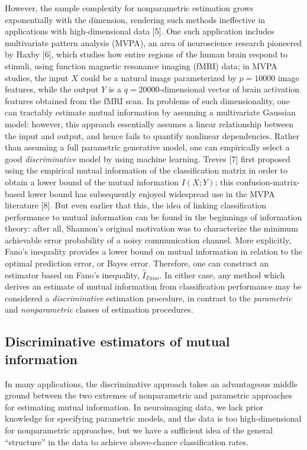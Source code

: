 \documentclass{article}
\begin{document}
However, the sample complexity for nonparametric estimation grows
exponentially with the dimension, rendering such methods ineffective
in applications with high-dimensional data [5].  One such
application includes multivariate pattern analysis (MVPA), an area of
neuroscience research pioneered by Haxby [6], which studies how
entire regions of the human brain respond to stimuli, using function
magnetic resonance imaging (fMRI) data; in MVPA studies, the input $X$
could be a natural image parameterized by $p = 10000$ image features,
while the output $Y$ is a $q=20000$-dimensional vector of brain
activation features obtained from the fMRI scan.  In problems of such
dimensionality, one can tractably estimate mutual information by
assuming a multivariate Gaussian model: however, this approach
essentially assumes a linear relationship between the input and
output, and hence fails to quantify nonlinear dependencies.  Rather
than assuming a full parametric generative model, one can empirically
select a good \emph{discriminative} model by using machine learning.
Treves [7] first proposed using the empirical mutual information of
the classification matrix in order to obtain a lower bound of the
mutual information $I(X; Y)$; this confusion-matrix-based lower bound
has subsequently enjoyed widespread use in the MVPA literature
[8].  But even earlier that this, the idea of linking
classification performance to mutual information can be found in the
beginnings of information theory: after all, Shannon's original
motivation was to characterize the minimum achievable error
probability of a noisy communication channel.  More explicitly, Fano's
inequality provides a lower bound on mutual information in relation to
the optimal prediction error, or Bayes error.  Therefore, one can
construct an estimator based on Fano's inequality, $\hat{I}_{Fano}$.
In either case, any method which derives an estimate of mutual
information from classification performance may be considered a
\emph{discriminative} estimation procedure, in contrast to the
\emph{parametric} and \emph{nonparametric} classes of estimation
procedures.

\subsection{Discriminative estimators of mutual information}

In many applications, the discriminative approach takes an
advantageous middle ground between the two extremes of nonparametric
and parametric approaches for estimating mutual information. In
neuroimaging data, we lack prior knowledge for specifying parametric
models, and the data is too high-dimensional for nonparametric
approaches, but we have a sufficient idea of the general ``structure''
in the data to achieve above-chance classification rates.
\end{document}
